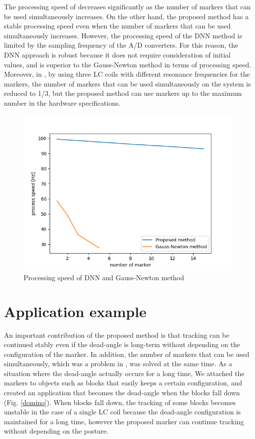 \documentclass[journal,twoside,web]{ieeecolor}
\begin{document}
The processing speed of \cite{im6d} decreases significantly as the number of markers that can be used simultaneously increases. On the other hand, the proposed method has a stable processing speed even when the number of markers that can be used simultaneously increases. However, the processing speed of the DNN method is limited by the sampling frequency of the A/D converters. For this reason, the DNN approach is robust because it does not require consideration of initial values, and is superior to the Gauss-Newton method in terms of processing speed. Moreover, in \cite{im6d}, by using three LC coils with different resonance frequencies for the markers, the number of markers that can be used simultaneously on the system is reduced to 1/3, but the proposed method can use markers up to the maximum number in the hardware specifications.

\begin{figure}[t]
    \centerline{\includegraphics[width=\columnwidth]{figure/speed.png}}
    \caption{Processing speed of DNN and Gauss-Newton method}
    \label{speed}
\end{figure}

\section{Application example}
An important contribution of the proposed method is that tracking can be continued stably even if the dead-angle is long-term without depending on the configuration of the marker. In addition, the number of markers that can be used simultaneously, which was a problem in \cite{im6d}, was solved at the same time. As a situation where the dead-angle actually occurs for a long time, We attached the markers to objects such as blocks that easily keeps a certain configuration, and created an application that becomes the dead-angle when the blocks fall down (Fig. \ref{domino}). When blocks fall down, the tracking of some blocks becomes unstable in the case of a single LC coil because the dead-angle configuration is maintained for a long time, however the proposed marker can continue tracking without depending on the posture.
\end{document}
